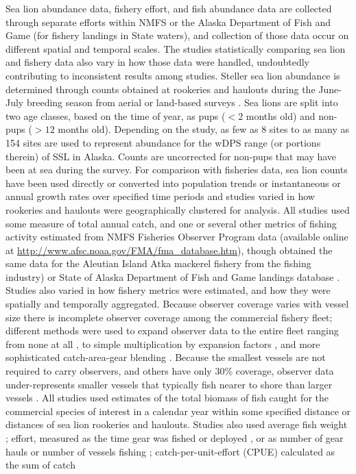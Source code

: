 \documentclass[nonumbib,leqno]{nrc1}
\begin{document}
Sea lion abundance data, fishery effort, and fish abundance data are collected through separate efforts within NMFS or the Alaska Department of Fish and Game (for fishery landings in State waters), and collection of those data occur on different spatial and temporal scales. The studies statistically comparing sea lion and fishery data also vary in how those data were handled, undoubtedly contributing to inconsistent results among studies. Steller sea lion abundance is determined through counts obtained at rookeries and haulouts during the June-July breeding season from aerial or land-based surveys \citep{FritzEtAl2013}. Sea lions are split into two age classes, based on the time of year, as pups ($<2$ months old) and non-pups ($>12$ months old). Depending on the study, as few as 8 sites \citep{Loughlin:1989kl} to as many as 154 sites \citep[though combined into 10 sub-areas;][]{afsc:2010dz} are used to represent abundance for the wDPS range (or portions therein) of SSL in Alaska. Counts are uncorrected for non-pups that may have been at sea during the survey. For comparison with fisheries data, sea lion counts have been used directly \citep{Ferrero:1994hc,Sampson:1995cr,Soboleff:2006fk,Trites:2010ly} or converted into population trends or instantaneous or annual growth rates over specified time periods \citep{Loughlin:1989kl,Sampson:1995cr,Hennen:2006bs,Dillingham:2006fv,Calkins:2008ve,afsc:2010dz,Trites:2010ly,Hui:2011uq} and studies varied in how rookeries and haulouts were geographically clustered for analysis. All studies used some measure of total annual catch, and one or several other metrics of fishing activity estimated from NMFS Fisheries Observer Program data (available online at \url{http://www.afsc.noaa.gov/FMA/fma_database.htm}), though \citet{Trites:2010ly} obtained the same data for the Aleutian Island Atka mackerel fishery from the fishing industry) or State of Alaska Department of Fish and Game landings database \citep{Soboleff:2006fk}. Studies also varied in how fishery metrics were estimated, and how they were spatially and temporally aggregated. Because observer coverage varies with vessel size there is incomplete observer coverage among the commercial fishery fleet; different methods were used to expand observer data to the entire fleet ranging from none at all \citep{Hui:2011uq}, to simple multiplication by expansion factors \citep[e.g.,][]{Dillingham:2006fv,Hennen:2006bs,Calkins:2008ve}, and more sophisticated catch-area-gear blending \citep{afsc:2010dz}. Because the smallest vessels are not required to carry observers, and others have only 30\% coverage, observer data under-represents smaller vessels that typically fish nearer to shore than larger vessels \citep{afsc:2010dz}. All studies used estimates of the total biomass of fish caught for the commercial species of interest in a calendar year within some specified distance or distances of sea lion rookeries and haulouts. Studies also used average fish weight \citep{Loughlin:1989kl}; effort, measured as the time gear was fished or deployed \citep{Sampson:1995cr,Hennen:2006bs,Dillingham:2006fv,Calkins:2008ve}, or as number of gear hauls \citep{Hennen:2006bs,Calkins:2008ve,Trites:2010ly} or number of vessels fishing \citep{Soboleff:2006fk}; catch-per-unit-effort (CPUE) calculated as the sum of catch 
\end{document}
